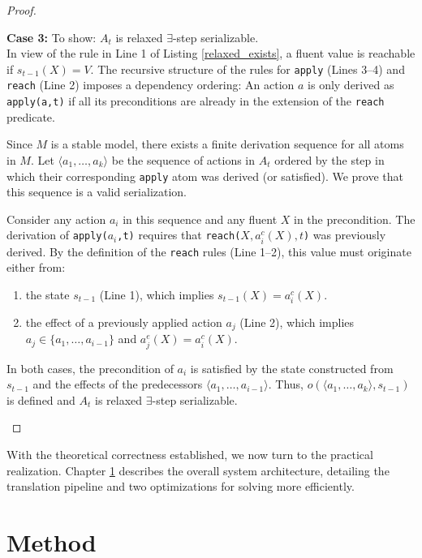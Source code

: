 \documentclass[
     11pt,                    %
     a4paper,             %
     BCOR=10mm,     %
     DIV=14,                 %
     listof=totoc,                    %
     bibliography=totoc,       %
     index=totoc,              %
     parskip            %
     twoside,
     headsepline
     ]{scrreprt}
\theoremstyle{definition}
\theoremstyle{definition}
\theoremstyle{remark}
\theoremstyle{bfnote}
\begin{document}
\begin{proof}
\begin{itemize}
      \textbf{Case 3: } To show: $A_t$ is relaxed $\exists$-step serializable. \\
      In view of the rule in Line 1 of Listing \ref{relaxed_exists}, a fluent value is reachable if $s_{t-1}(X)=V$.
      The recursive structure of the rules for \texttt{apply} (Lines 3--4) and \texttt{reach} (Line 2) imposes a dependency ordering: An action $a$ is only derived as \texttt{apply(a,t)} if all its preconditions are already in the extension of the \texttt{reach} predicate.

      Since $M$ is a stable model, there exists a finite derivation sequence for all atoms in $M$. Let $\langle a_1, \dots, a_k \rangle$ be the sequence of actions in $A_t$ ordered by the step in which their corresponding \texttt{apply} atom was derived (or satisfied).
      We prove that this sequence is a valid serialization.

      Consider any action $a_i$ in this sequence and any fluent $X$ in the precondition.
      The derivation of \texttt{apply($a_i$,t)} requires that \texttt{reach($X, a_i^c(X), t$)} was previously derived. By the definition of the \texttt{reach} rules (Line 1--2), this value must originate either from:
      \begin{enumerate}
        \item the state $s_{t-1}$ (Line 1), which implies $s_{t-1}(X) = a_i^c(X)$.
        \item the effect of a previously applied action $a_j$ (Line 2), which implies $a_j \in \{a_1, \dots, a_{i-1}\}$ and $a_j^e(X) = a_i^c(X)$.
      \end{enumerate}
      In both cases, the precondition of $a_i$ is satisfied by the state constructed from $s_{t-1}$ and the effects of the predecessors $\langle a_1, \dots, a_{i-1} \rangle$.
      Thus, $o(\langle a_1, \dots, a_k \rangle, s_{t-1})$ is defined and $A_t$ is relaxed $\exists$-step serializable.
  \end{itemize}
\end{proof}

With the theoretical correctness established, we now turn to the practical realization. Chapter \ref{method} describes the overall system architecture, detailing the translation pipeline and two optimizations for solving more efficiently.

\chapter{Method} \label{method}
\end{document}
